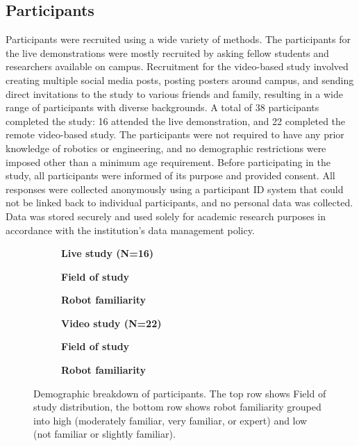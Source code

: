 \subsection{Participants}
Participants were recruited using a wide variety of methods. The participants for the live demonstrations were mostly recruited by asking fellow students and researchers available on campus. Recruitment for the video-based study involved creating multiple social media posts, posting posters around campus, and sending direct invitations to the study to various friends and family, resulting in a wide range of participants with diverse backgrounds.
A total of 38 participants completed the study: 16 attended the live demonstration, and 22 completed the remote video-based study. The participants were not required to have any prior knowledge of robotics or engineering, and no demographic restrictions were imposed other than a minimum age requirement. Before participating in the study, all participants were informed of its purpose and provided consent. All responses were collected anonymously using a participant ID system that could not be linked back to individual participants, and no personal data was collected. Data was stored securely and used solely for academic research purposes in accordance with the institution's data management policy.

\begin{figure}[H]
\centering

\begin{subfigure}[t]{0.48\textwidth}
\centering
{\small\textbf{Live study (N=16)}}
\vspace{1.0cm}



\vspace{1.0cm}
{\small \textbf{Field of study}}
\vspace{0.8cm}



\vspace{0.5cm}
{\small \textbf{Robot familiarity}}
\end{subfigure}
\hfill
\begin{subfigure}[t]{0.48\textwidth}
\centering
{\small\textbf{Video study (N=22)}}
\vspace{0.1cm}



\vspace{0.1cm}
{\small \textbf{Field of study}}
\vspace{0.8cm}



\vspace{0.6cm}
{\small \textbf{Robot familiarity}}
\end{subfigure}

\caption[Demographic breakdown of participants]{Demographic breakdown of participants. The top row shows
Field of study distribution, the bottom row shows robot familiarity
grouped into high (moderately familiar, very familiar, or expert)
and low (not familiar or slightly familiar).}
\label{fig:demographics_pie}
\end{figure}

